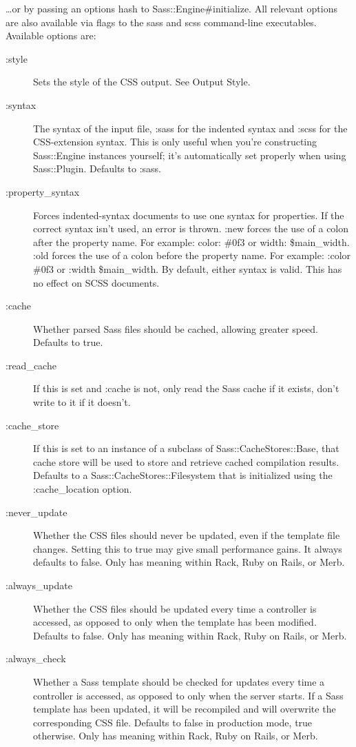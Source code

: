\documentclass[10pt]{article}
\begin{document}
 …or by passing an options hash to Sass::Engine\#initialize. All relevant options are also available via flags to the sass and scss command-line executables. Available options are:
\begin{description}
\item[:style]Sets the style of the CSS output. See Output Style.
\item[:syntax]The syntax of the input file, :sass for the indented syntax and :scss for the CSS-extension syntax. This is only useful when you’re constructing Sass::Engine instances yourself; it’s automatically set properly when using Sass::Plugin. Defaults to :sass.
\item[:property\_syntax]Forces indented-syntax documents to use one syntax for properties. If the correct syntax isn’t used, an error is thrown. :new forces the use of a colon after the property name. For example: color: \#0f3 or width: \$main\_width. :old forces the use of a colon before the property name. For example: :color \#0f3 or :width \$main\_width. By default, either syntax is valid. This has no effect on SCSS documents.
\item[:cache]Whether parsed Sass files should be cached, allowing greater speed. Defaults to true.
\item[:read\_cache]If this is set and :cache is not, only read the Sass cache if it exists, don’t write to it if it doesn’t.
\item[:cache\_store]If this is set to an instance of a subclass of Sass::CacheStores::Base, that cache store will be used to store and retrieve cached compilation results. Defaults to a Sass::CacheStores::Filesystem that is initialized using the :cache\_location option.
\item[:never\_update]Whether the CSS files should never be updated, even if the template file changes. Setting this to true may give small performance gains. It always defaults to false. Only has meaning within Rack, Ruby on Rails, or Merb.
\item[:always\_update]Whether the CSS files should be updated every time a controller is accessed, as opposed to only when the template has been modified. Defaults to false. Only has meaning within Rack, Ruby on Rails, or Merb.
\item[:always\_check]Whether a Sass template should be checked for updates every time a controller is accessed, as opposed to only when the server starts. If a Sass template has been updated, it will be recompiled and will overwrite the corresponding CSS file. Defaults to false in production mode, true otherwise. Only has meaning within Rack, Ruby on Rails, or Merb.

\end{description}
\end{document}
